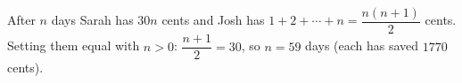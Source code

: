After $n$ days Sarah has $30n$ cents and Josh has $1+2+\cdots+n=\dfrac{n(n+1)}{2}$ cents. Setting them equal with $n>0$: $\dfrac{n+1}{2}=30$, so $n=\boxed{59}$ days (each has saved $1770$ cents).
